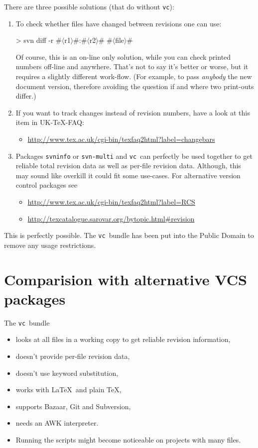 \documentclass[11pt]{article}
\newcommand*{\pkg}{\texttt{vc}}
\newcommand*{\descr}[1]{$\langle$#1$\rangle$}
\begin{document}
There are three possible solutions (that do without \pkg):
\begin{enumerate}
\item To check whether files have changed between revisions one can use:
\begin{listing}[style=shell, escapechar=\#]
> svn diff -r #\descr{r1}#:#\descr{r2}# #\descr{file}#
\end{listing}
Of course, this is an on-line only solution, while you can check printed
numbers off-line and anywhere.  That's not to say it's better or worse,
but it requires a slightly different work-flow.  (For example, to pass
\emph{anybody} the new document version, therefore avoiding the question
if and where two print-outs differ.)

\item If you want to track changes instead of revision numbers, have a
  look at this item in UK-TeX-FAQ:
  \begin{itemize}
  \item \url{http://www.tex.ac.uk/cgi-bin/texfaq2html?label=changebars}
  \end{itemize}

\item Packages \texttt{svninfo} or \texttt{svn-multi} and \pkg\ can
  perfectly be used together to get reliable total revision data as well
  as per-file revision data.  Although, this may sound like overkill it
  could fit some use-cases.  For alternative version control packages
  see
  \begin{itemize}
  \item \url{http://www.tex.ac.uk/cgi-bin/texfaq2html?label=RCS}
  \item \url{http://texcatalogue.sarovar.org/bytopic.html#revision}
  \end{itemize}
\end{enumerate}

 This is perfectly possible.  The \pkg\ bundle has
been put into the Public Domain to remove any usage restrictions.



\section{Comparision with alternative VCS packages}
\label{sec:comparision}
The \pkg\ bundle
\begin{itemize}
\item looks at all files in a working copy to get reliable revision
  information,
\item doesn't provide per-file revision data,
\item doesn't use keyword substitution,
\item works with \LaTeX\ and plain \TeX,
\item supports Bazaar, Git and Subversion,
\item needs an AWK interpreter.
\item Running the scripts might become noticeable on projects with many
  files.
\end{itemize}
\end{document}
